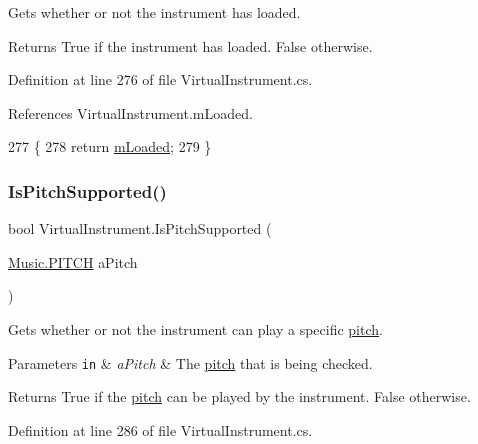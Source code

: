 Gets whether or not the instrument has loaded. 

\begin{DoxyReturn}{Returns}
True if the instrument has loaded. False otherwise. 
\end{DoxyReturn}


Definition at line 276 of file Virtual\+Instrument.\+cs.



References Virtual\+Instrument.\+m\+Loaded.


\begin{DoxyCode}
277     \{
278         \textcolor{keywordflow}{return} \hyperlink{group___v_i_base_pro_var_ga8978807d1878db5aae91fbd057c46097}{mLoaded};
279     \}
\end{DoxyCode}
\mbox{\label{group___v_i_base_pub_func_ga89655451c108a7ad5cb96ab308e33937}} 
\subsubsection{\texorpdfstring{Is\+Pitch\+Supported()}{IsPitchSupported()}}
{\footnotesize\ttfamily bool Virtual\+Instrument.\+Is\+Pitch\+Supported (\begin{DoxyParamCaption}\item[{\hyperlink{group___music_enums_ga508f69b199ea518f935486c990edac1d}{Music.\+P\+I\+T\+CH}}]{a\+Pitch }\end{DoxyParamCaption})}



Gets whether or not the instrument can play a specific \hyperlink{group___music_enums_ga508f69b199ea518f935486c990edac1d}{pitch}. 


\begin{DoxyParams}[1]{Parameters}
\mbox{\tt in}  & {\em a\+Pitch} & The \hyperlink{group___music_enums_ga508f69b199ea518f935486c990edac1d}{pitch} that is being checked. \\
\hline
\end{DoxyParams}
\begin{DoxyReturn}{Returns}
True if the \hyperlink{group___music_enums_ga508f69b199ea518f935486c990edac1d}{pitch} can be played by the instrument. False otherwise. 
\end{DoxyReturn}


Definition at line 286 of file Virtual\+Instrument.\+cs.



